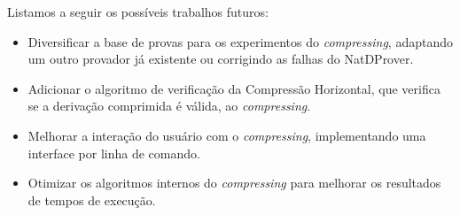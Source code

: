 Listamos a seguir os possíveis trabalhos futuros:
\begin{itemize}
    \item Diversificar a base de provas para os experimentos do \textit{compressing}, adaptando um outro provador já existente ou corrigindo as falhas do NatDProver.
    \item Adicionar o algoritmo de verificação da Compressão Horizontal, que verifica se a derivação comprimida é válida, ao \textit{compressing}.
    \item Melhorar a interação do usuário com o \textit{compressing}, implementando uma interface por linha de comando.
    \item Otimizar os algoritmos internos do \textit{compressing} para melhorar os resultados de tempos de execução.
\end{itemize}
